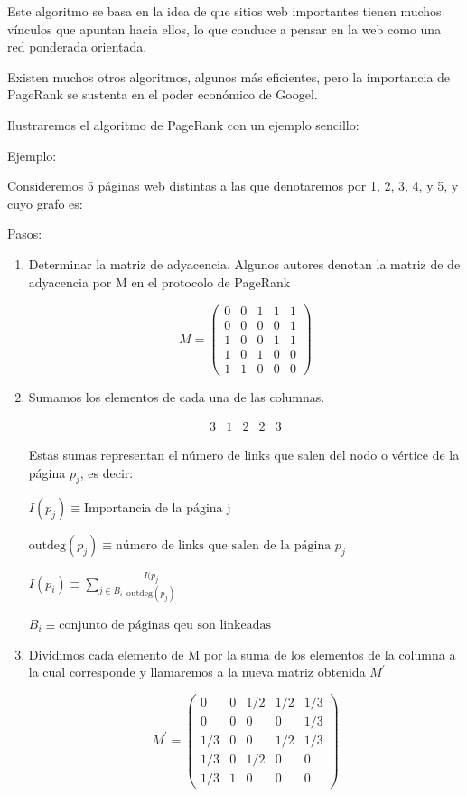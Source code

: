 \documentclass[11pt, spanish]{report}
\begin{document}
Este algoritmo se basa en la idea de que sitios web importantes tienen muchos vínculos que apuntan hacia ellos, lo que conduce a pensar en la web como una red ponderada orientada.

Existen muchos otros algoritmos, algunos más eficientes, pero la importancia de PageRank se sustenta en el poder económico de Googel.

Ilustraremos el algoritmo de PageRank con un ejemplo sencillo:

Ejemplo:

Consideremos 5 páginas web distintas a las que denotaremos por 1, 2, 3, 4, y 5, y cuyo grafo es:
\vspace{3cm}

Pasos:
\begin{enumerate}
\item Determinar la matriz de adyacencia. Algunos autores denotan la matriz de de adyacencia por M en el protocolo de PageRank

\[
M = \begin{pmatrix}
0 & 0 & 1 & 1 & 1 \\
0 & 0 & 0 & 0 & 1 \\
1 & 0 & 0 & 1 & 1 \\
1 & 0 & 1 & 0 & 0 \\
1 & 1 & 0 & 0 & 0
\end{pmatrix}
\]

\item Sumamos los elementos de cada una de las columnas.

\[
\begin{matrix}
3 & 1 & 2 & 2 & 3
\end{matrix}
\]

Estas sumas representan el número de links que salen del nodo o vértice de la página $p_j$, es decir: 

$I(p_j) \equiv \text{Importancia de la página j}$

$\mathrm{outdeg}(p_j) \equiv \text{número de links que salen de la página } p_j$

$I(p_i) \equiv \sum\limits_{j \in B_i} \frac{I(p_j}{\mathrm{outdeg}(p_j)}$

$B_i \equiv \text{conjunto de páginas qeu son linkeadas}$

\item Dividimos cada elemento de M por la suma de los elementos de la columna a la cual corresponde y llamaremos a la nueva matriz obtenida $M^\prime$

\[
M^\prime = \begin{pmatrix}
0 & 0 & 1/2 & 1/2 & 1/3 \\
0 & 0 & 0 & 0 & 1/3 \\
1/3 & 0 & 0 & 1/2 & 1/3 \\
1/3 & 0 & 1/2 & 0 & 0 \\
1/3 & 1 & 0 & 0 & 0
\end{pmatrix}
\]


\end{enumerate}
\end{document}
